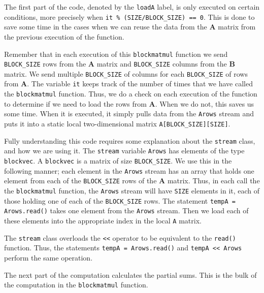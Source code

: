 The first part of the code, denoted by the \lstinline{loadA} label, is only executed on certain conditions, more precisely when \lstinline{it % (SIZE/BLOCK_SIZE) == 0}. This is done to save some time in the cases when we can reuse the data from the $\mathbf{A}$ matrix from the previous execution of the function. 

Remember that in each execution of this \lstinline{blockmatmul} function we send \lstinline{BLOCK_SIZE} rows from the $\mathbf{A}$ matrix and \lstinline{BLOCK_SIZE} columns from the $\mathbf{B}$ matrix. We send multiple \lstinline{BLOCK_SIZE} of columns for each \lstinline{BLOCK_SIZE} of rows from $\mathbf{A}$. The variable \lstinline{it} keeps track of the number of times that we have called the \lstinline{blockmatmul} function. Thus, we do a check on each execution of the function to determine if we need to load the rows from $\mathbf{A}$. When we do not, this saves us some time. When it is executed, it simply pulls data from the \lstinline{Arows} stream and puts it into a static local two-dimensional matrix \lstinline{A[BLOCK_SIZE][SIZE]}. 

Fully understanding this code requires some explanation about the \lstinline{stream} class, and how we are using it. The \lstinline{stream} variable \lstinline{Arows} has elements of the type \lstinline{blockvec}. A \lstinline{blockvec} is a matrix of size \lstinline{BLOCK_SIZE}. We use this in the following manner; each element in the \lstinline{Arows} stream has an array that holds one element from each of the \lstinline{BLOCK_SIZE} rows of the $\mathbf{A}$ matrix. Thus, in each call the the \lstinline{blockmatmul} function, the \lstinline{Arows} stream will have \lstinline{SIZE} elements in it, each of those holding one of each of the \lstinline{BLOCK_SIZE} rows. The statement \lstinline{tempA = Arows.read()} takes one element from the \lstinline{Arows} stream. Then we load each of these elements into the appropriate index in the local \lstinline{A} matrix.

\begin{aside}
The \lstinline{stream} class overloads the \lstinline{<<} operator to be equivalent to the \lstinline{read()} function. Thus, the statements \lstinline{tempA = Arows.read()} and \lstinline{tempA << Arows} perform the same operation.
\end{aside}

The next part of the computation calculates the partial sums. This is the bulk of the computation in the \lstinline{blockmatmul} function. 

